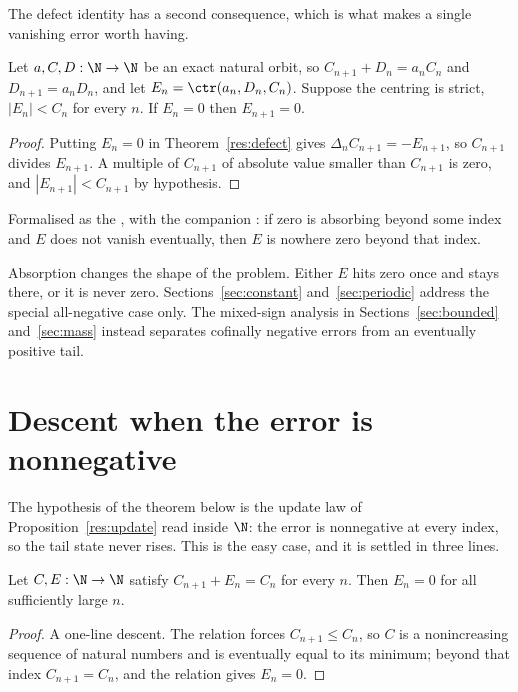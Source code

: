 The defect identity has a second consequence, which is what makes a single
vanishing error worth having.

\begin{theorem}\label{res:absorb}
Let $a,C,D:\N\to\N$ be an exact natural orbit, so
$C_{n+1}+D_n=a_nC_n$ and $D_{n+1}=a_nD_n$, and let
$E_n=\ctr(a_n,D_n,C_n)$.  Suppose the centring is strict, $|E_n|<C_n$ for
every $n$.  If $E_n=0$ then $E_{n+1}=0$.
\end{theorem}

\begin{proof}
Putting $E_n=0$ in Theorem~\ref{res:defect} gives
$\Delta_n C_{n+1}=-E_{n+1}$, so $C_{n+1}$ divides $E_{n+1}$.  A multiple of
$C_{n+1}$ of absolute value smaller than $C_{n+1}$ is zero, and
$|E_{n+1}|<C_{n+1}$ by hypothesis.
\end{proof}

\noindent Formalised as the
, with the companion
: if zero is absorbing beyond some index and $E$ does not vanish
eventually, then $E$ is nowhere zero beyond that index.

Absorption changes the shape of the problem.  Either $E$ hits zero once and
stays there, or it is never zero.  Sections~\ref{sec:constant}
and~\ref{sec:periodic} address the special all-negative case only.  The
mixed-sign analysis
in Sections~\ref{sec:bounded} and~\ref{sec:mass} instead separates cofinally
negative errors from an eventually positive tail.

\section{Descent when the error is nonnegative}\label{sec:descent}

The hypothesis of the theorem below is the update law of
Proposition~\ref{res:update} read inside $\N$: the error is nonnegative at
every index, so the tail state never rises.  This is the easy case, and it is
settled in three lines.

\begin{theorem}[descent]\label{res:descent}
Let $C,E:\N\to\N$ satisfy $C_{n+1}+E_n=C_n$ for every $n$.  Then $E_n=0$ for
all sufficiently large $n$.
\end{theorem}

\begin{proof}
A one-line descent.  The relation forces $C_{n+1}\le C_n$, so $C$ is a nonincreasing sequence of
natural numbers and is eventually equal to its minimum; beyond that index
$C_{n+1}=C_n$, and the relation gives $E_n=0$.
\end{proof}

